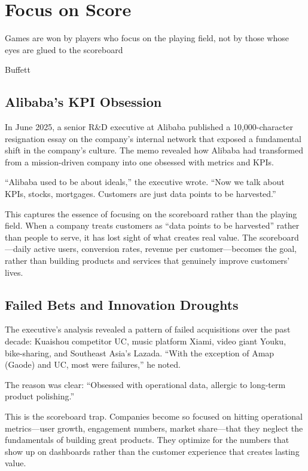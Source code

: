 \chapter{Focus on Score}
\nocite{ciw_alibaba_identity_crisis}
\epigraph{Games are won by players who focus on the playing field, not by those whose eyes are glued to the scoreboard}{Buffett}

\section{Alibaba's KPI Obsession}

In June 2025, a senior R\&D executive at Alibaba published a 10,000-character resignation essay on the company's internal network that exposed a fundamental shift in the company's culture. The memo revealed how Alibaba had transformed from a mission-driven company into one obsessed with metrics and KPIs.

``Alibaba used to be about ideals,'' the executive wrote. ``Now we talk about KPIs, stocks, mortgages. Customers are just data points to be harvested.''

This captures the essence of focusing on the scoreboard rather than the playing field. When a company treats customers as ``data points to be harvested'' rather than people to serve, it has lost sight of what creates real value. The scoreboard—daily active users, conversion rates, revenue per customer—becomes the goal, rather than building products and services that genuinely improve customers' lives.

\section{Failed Bets and Innovation Droughts}

The executive's analysis revealed a pattern of failed acquisitions over the past decade: Kuaishou competitor UC, music platform Xiami, video giant Youku, bike-sharing, and Southeast Asia's Lazada. ``With the exception of Amap (Gaode) and UC, most were failures,'' he noted.

The reason was clear: ``Obsessed with operational data, allergic to long-term product polishing.''

This is the scoreboard trap. Companies become so focused on hitting operational metrics—user growth, engagement numbers, market share—that they neglect the fundamentals of building great products. They optimize for the numbers that show up on dashboards rather than the customer experience that creates lasting value.

